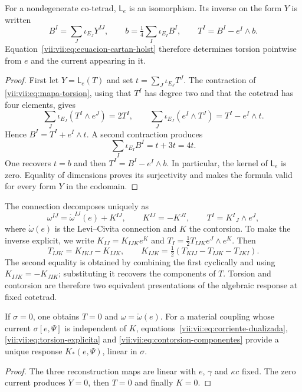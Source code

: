 \begin{theorem}
\label{vii:vii:thm:inversion-torsion}
For a nondegenerate co-tetrad, \(\mathsf L_e\) is an isomorphism.
Its inverse on the form \(Y\) is written
\begin{equation}
 B^I=\sum_J\iota_{E_J}Y^{IJ},\qquad
 b=\tfrac14\sum_I\iota_{E_I}B^I,\qquad
 T^I=B^I-e^I\wedge b.
 \label{vii:vii:eq:torsion-explicita}
\end{equation}
Equation~\eqref{vii:vii:eq:ecuacion-cartan-holst} therefore determines
torsion pointwise from \(e\) and the current appearing in it.
\end{theorem}
\begin{proof}
First let \(Y=\mathsf L_e(T)\) and set \(t=\sum_J\iota_{E_J}T^J\). The contraction of \eqref{vii:vii:eq:mapa-torsion}, using that \(T^I\) has degree two and that the cotetrad has four elements, gives
\[
 \sum_J\iota_{E_J}(T^I\wedge e^J)=2T^I,
 \qquad
 \sum_J\iota_{E_J}(e^I\wedge T^J)=T^I-e^I\wedge t.
\]
Hence \(B^I=T^I+e^I\wedge t\). A second contraction produces
\[
 \sum_I\iota_{E_I}B^I=t+3t=4t.
\]
One recovers \(t=b\) and then \(T^I=B^I-e^I\wedge b\). In particular, the kernel of \(\mathsf L_e\) is zero. Equality of dimensions proves its surjectivity and makes the formula valid for every form \(Y\) in the codomain.
\end{proof}

The connection decomposes uniquely as
\begin{equation}
 \omega^{IJ}=\mathring\omega^{IJ}(e)+K^{IJ},\qquad
 K^{IJ}=-K^{JI},\qquad T^I=K^I{}_{J}\wedge e^J,
 \label{vii:vii:eq:contorsion}
\end{equation}
where \(\mathring\omega(e)\) is the Levi--Civita connection and \(K\) the contorsion. To make the inverse explicit, we write \(K_{IJ}=K_{IJK}e^K\) and \(T_I=\tfrac12T_{IJK}e^J\wedge e^K\). Then
\begin{equation}
 T_{IJK}=K_{IKJ}-K_{IJK},\qquad
 K_{IJK}=\tfrac12(T_{KIJ}-T_{IJK}-T_{JKI}).
 \label{vii:vii:eq:contorsion-componentes}
\end{equation}
The second equality is obtained by combining the first cyclically and using \(K_{IJK}=-K_{JIK}\); substituting it recovers the components of \(T\). Torsion and contorsion are therefore two equivalent presentations of the algebraic response at fixed cotetrad.

\begin{corollary}
\label{vii:vii:cor:desacoplamiento-torsional}
If \(\sigma=0\), one obtains \(T=0\) and \(\omega=\mathring\omega(e)\). For a material coupling whose current \(\sigma[e,\Psi]\) is independent of \(K\), equations~\eqref{vii:vii:eq:corriente-dualizada}, \eqref{vii:vii:eq:torsion-explicita} and \eqref{vii:vii:eq:contorsion-componentes} provide a unique response \(K_*(e,\Psi)\), linear in \(\sigma\).
\end{corollary}
\begin{proof}
The three reconstruction maps are linear with \(e\), \(\gamma\) and \(\kappa c\) fixed. The zero current produces \(Y=0\), then \(T=0\) and finally \(K=0\).
\end{proof}

